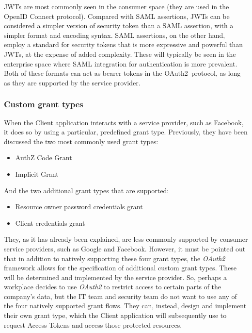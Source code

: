 \documentclass[a4paper,12pt]{article}
\def\oauth{OAuth2\xspace}
\begin{document}
JWTs are most commonly seen in the consumer space (they are used in the OpenID Connect protocol). Compared with SAML assertions, JWTs can be considered a simpler version of security token than a SAML assertion, with a simpler format and encoding syntax. SAML assertions, on the other hand, employ a standard for security tokens that is more expressive and powerful than JWTs, at the expense of added complexity. These will typically be seen in the enterprise space where SAML integration for authentication is more prevalent. Both of these formats can act as bearer tokens in the \oauth\ protocol, as long as they are supported by the service provider.

\subsubsection{Custom grant types}
When the Client application interacts with a service provider, such as Facebook, it does so by using a particular, predefined grant type. Previously, they have been discussed the two most commonly used grant types:

\begin{itemize}
    \item AuthZ Code Grant
    \item Implicit Grant
\end{itemize}

And the two additional grant types that are supported:

\begin{itemize}
    \item Resource owner password credentials grant
    \item Client credentials grant
\end{itemize}

They, as it has already been explained, are less commonly supported by consumer service providers, such as Google and Facebook. However, it must be pointed out that in addition to natively supporting these four grant types, the \textit{\oauth} framework allows for the specification of additional custom grant types. These will be determined and implemented by the service provider. So, perhaps a workplace decides to use \textit{\oauth} to restrict access to certain parts of the company's data, but the IT team and security team do not want to use any of the four natively supported grant flows. They can, instead, design and implement their own grant type, which the Client application will subsequently use to request Access Tokens and access those protected resources.
\end{document}

